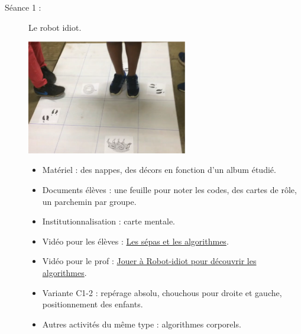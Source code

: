 \begin{exercice*}
\begin{description}
\item[Séance 1 :] Le robot idiot. \\
\bigskip
\begin{minipage}{8cm}
   \includegraphics[width=7cm]{Geometrie_did/Images/Geo6_analyse_robot_idiot}
\end{minipage}
\begin{minipage}{8.5cm}
   \begin{itemize}
      \item Matériel : des nappes, des décors en fonction d'un album étudié.
      \item Documents élèves : une feuille pour noter les codes, des cartes de rôle, un parchemin par groupe.
      \item Institutionnalisation : carte mentale.
      \item Vidéo pour les élèves : \href{http://www.universcience.tv/video-les-sepas-et-les-algorithmes-5829.html}{Les sépas et les algorithmes}.
      \item Vidéo pour le prof : \href{https://www.youtube.com/watch?time_continue=3&v=9AtmJ9mTaB0}{Jouer à \og Robot-idiot \fg{} pour découvrir les algorithmes}.
      \item Variante C1-2 : repérage absolu, chouchous pour droite et gauche, positionnement des enfants.
      \item Autres activités du même type : algorithmes corporels.
   \end{itemize}
\end{minipage}

\pagebreak


\end{description}
\end{exercice*}
